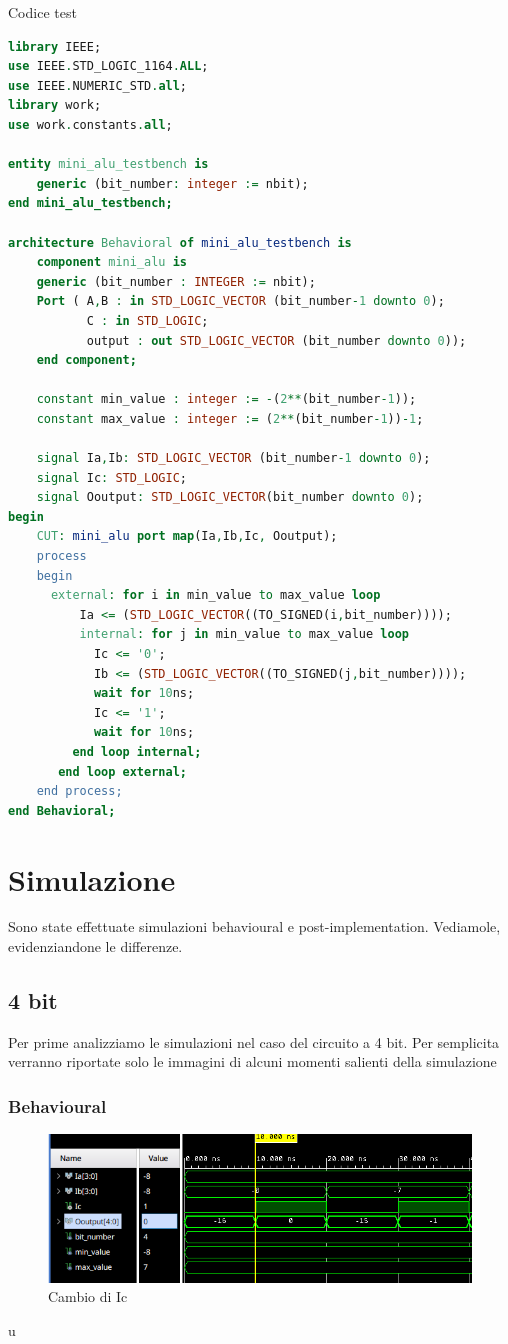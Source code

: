 \begin{problem}{Codice test}{}
\begin{lstlisting}[language=VHDL]
library IEEE;
use IEEE.STD_LOGIC_1164.ALL;
use IEEE.NUMERIC_STD.all;
library work;
use work.constants.all;

entity mini_alu_testbench is
    generic (bit_number: integer := nbit);
end mini_alu_testbench;

architecture Behavioral of mini_alu_testbench is
    component mini_alu is
    generic (bit_number : INTEGER := nbit);
    Port ( A,B : in STD_LOGIC_VECTOR (bit_number-1 downto 0);
           C : in STD_LOGIC;
           output : out STD_LOGIC_VECTOR (bit_number downto 0));
    end component;
    
    constant min_value : integer := -(2**(bit_number-1));
    constant max_value : integer := (2**(bit_number-1))-1;

    signal Ia,Ib: STD_LOGIC_VECTOR (bit_number-1 downto 0);
    signal Ic: STD_LOGIC;
    signal Ooutput: STD_LOGIC_VECTOR(bit_number downto 0);
begin 
    CUT: mini_alu port map(Ia,Ib,Ic, Ooutput);
    process 
    begin
      external: for i in min_value to max_value loop
          Ia <= (STD_LOGIC_VECTOR((TO_SIGNED(i,bit_number))));
          internal: for j in min_value to max_value loop
            Ic <= '0';
            Ib <= (STD_LOGIC_VECTOR((TO_SIGNED(j,bit_number))));
            wait for 10ns;
            Ic <= '1';
            wait for 10ns;
         end loop internal;
       end loop external;   
    end process;
end Behavioral;
\end{lstlisting}
\end{problem}

\newpage
\section{Simulazione}
Sono state effettuate simulazioni behavioural e post-implementation. Vediamole, evidenziandone le differenze.

\subsection{4 bit}
Per prime analizziamo le simulazioni nel caso del circuito a 4 bit.
Per semplicita verranno riportate solo le immagini di alcuni momenti salienti della simulazione
\subsubsection{Behavioural}
\begin{figure}[ht]
      \centering
      \includegraphics[width=1\textwidth]{assets/simulations/behavioural/4bit/4bit_behav.png}
      \caption{Cambio di Ic}
      \label{4bit_behav}
\end{figure}u

